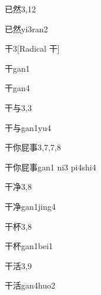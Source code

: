 \begin{entry}{已然}{3,12}
  \begin{phonetics}{已然}{yi3ran2}
  \end{phonetics}
\end{entry}

\begin{entry}{干}{3}[Radical 干]
  \begin{phonetics}{干}{gan1}
  \end{phonetics}
  \begin{phonetics}{干}{gan4}
  \end{phonetics}
\end{entry}

\begin{entry}{干与}{3,3}
  \begin{phonetics}{干与}{gan1yu4}
  \end{phonetics}
\end{entry}

\begin{entry}{干你屁事}{3,7,7,8}
  \begin{phonetics}{干你屁事}{gan1 ni3 pi4shi4}
  \end{phonetics}
\end{entry}

\begin{entry}{干净}{3,8}
  \begin{phonetics}{干净}{gan1jing4}
  \end{phonetics}
\end{entry}

\begin{entry}{干杯}{3,8}
  \begin{phonetics}{干杯}{gan1bei1}
  \end{phonetics}
\end{entry}

\begin{entry}{干活}{3,9}
  \begin{phonetics}{干活}{gan4huo2}
  \end{phonetics}
\end{entry}

